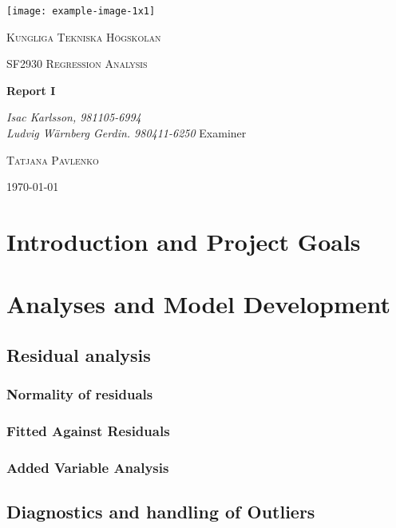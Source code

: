 \documentclass[11pt]{article}
\author{Ludde}
\date{\today}
\title{}
\begin{document}
\begin{titlepage}
\centering
\texttt{[image: example-image-1x1]}\par\vspace{1cm}
{\scshape\LARGE Kungliga Tekniska Högskolan \par}
\vspace{1cm}
{\scshape\Large SF2930 Regression Analysis \par}
\vspace{1.5cm}
{\huge\bfseries Report I \\  \par}
\vspace{2cm}
{\Large\itshape Isac Karlsson, 981105-6994\\ Ludvig Wärnberg Gerdin. 980411-6250}
\vfill
Examiner \par
\textsc{Tatjana Pavlenko}

\vfill

{\large \today\par}
\end{titlepage}

\newpage
\tableofcontents
\newpage

\section{Introduction and Project Goals}
\label{sec:org8daf345}
\section{Analyses and Model Development}
\label{sec:org8ccb171}
\subsection{Residual analysis}
\label{sec:orge9ec91e}
\subsubsection{Normality of residuals}
\label{sec:org15b15ab}
\subsubsection{Fitted Against Residuals}
\label{sec:orge354d77}
\subsubsection{Added Variable Analysis}
\label{sec:org3228fcf}
\subsection{Diagnostics and handling of Outliers}
\label{sec:orgdb6c46b}
\end{document}
